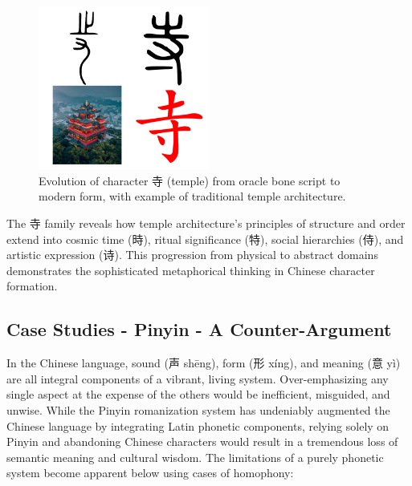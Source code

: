 \documentclass[11pt,letterpaper]{article}
\begin{document}
\begin{figure}
\centering
\includegraphics[width=0.5\textwidth]{./images/zi_temple.png}
\caption{Evolution of character 寺 (temple) from oracle bone script to
modern form, with example of traditional temple architecture.}
\end{figure}

The 寺 family reveals how temple architecture's principles of structure
and order extend into cosmic time (時), ritual significance (特), social
hierarchies (侍), and artistic expression (诗). This progression from
physical to abstract domains demonstrates the sophisticated metaphorical
thinking in Chinese character formation.

\subsection{Case Studies - Pinyin - A
Counter-Argument}\label{case-studies---pinyin---a-counter-argument}

In the Chinese language, sound (声 shēng), form (形 xíng), and meaning
(意 yì) are all integral components of a vibrant, living system.
Over-emphasizing any single aspect at the expense of the others would be
inefficient, misguided, and unwise. While the Pinyin romanization system
has undeniably augmented the Chinese language by integrating Latin
phonetic components, relying solely on Pinyin and abandoning Chinese
characters would result in a tremendous loss of semantic meaning and
cultural wisdom. The limitations of a purely phonetic system become
apparent below using cases of homophony:
\end{document}
